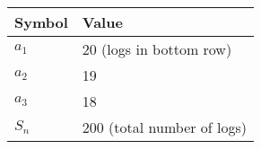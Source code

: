 \begin{tabular}{ | m{1.0cm} | m{4cm} | } 
  \hline
 Symbol & Value \\ 
 \hline
$a_1$& 20 (logs in bottom row) \\
\hline
$a_2$ & 19\\ 
\hline
$a_3$ & 18\\ 
\hline
$S_n$& 200 (total number of logs) \\
\hline
\end{tabular}\\
\caption{}
\label{Table:1}